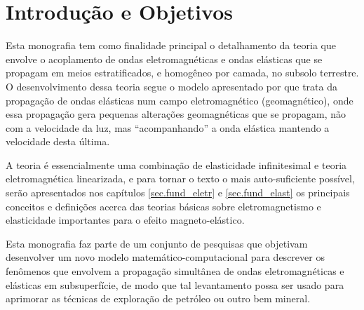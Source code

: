\chapter{Introdu\c{c}\~ao e Objetivos}
Esta monografia tem como finalidade principal o detalhamento da teoria que envolve o acoplamento de ondas eletromagn\'eticas e ondas el\'asticas que se propagam em meios estratificados, e homog\^eneo por camada, no subsolo terrestre. O desenvolvimento dessa teoria segue o modelo apresentado por \cite{erigen_1963} que trata da propaga\c{c}\~ao de ondas el\'asticas num campo eletromagn\'etico (geomagn\'etico), onde essa propaga\c{c}\~ao gera pequenas altera\c{c}\~oes geomagn\'eticas que se propagam, n\~ao com a velocidade da luz, mas ``acompanhando'' a onda el\'astica mantendo a velocidade desta \'ultima. 

A teoria é essencialmente uma combinação de elasticidade infinitesimal e teoria eletromagnética linearizada, e para tornar o texto o mais auto-suficiente poss\'ivel, serão apresentados nos capítulos \ref{sec.fund_eletr} e \ref{sec.fund_elast} os principais conceitos e definições acerca das teorias básicas sobre eletromagnetismo e elasticidade importantes para o efeito magneto-el\'astico.

Esta monografia faz parte de um conjunto de pesquisas que objetivam desenvolver um novo modelo matemático-computacional para descrever os fenômenos que envolvem a propagação simultânea de ondas eletromagnéticas e elásticas em subsuperfície, de modo que tal levantamento possa ser usado para aprimorar as técnicas de exploração de petróleo ou outro bem mineral.